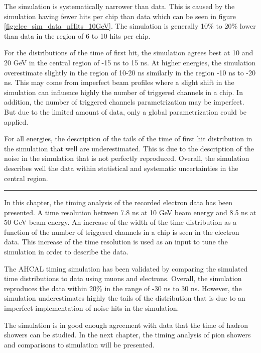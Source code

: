 The simulation is systematically narrower than data. This is caused by the simulation having fewer hits per chip than data which can be seen in figure \ref{fig:elec_sim_data_nHits_10GeV}. The simulation is generally 10\% to 20\% lower than data in the region of 6 to 10 hits per chip.

For the distributions of the time of first hit, the simulation agrees best at 10 and 20 GeV in the central region of -15 ns to 15 ns. At higher energies, the simulation overestimate slightly in the region of 10-20 ns similarly in the region -10 ns to -20 ns. This may come from imperfect beam profiles where a slight shift in the simulation can influence highly the number of triggered channels in a chip. In addition, the number of triggered channels parametrization may be imperfect. But due to the limited amount of data, only a global parametrization could be applied.

For all energies, the description of the tails of the time of first hit distribution in the simulation that well are underestimated. This is due to the description of the noise in the simulation that is not perfectly reproduced. Overall, the simulation describes well the data within statistical and systematic uncertainties in the central region.

\begin{center}
	\rule{0.5\textwidth}{.4pt}
\end{center}

In this chapter, the timing analysis of the recorded electron data has been presented. A time resolution between 7.8 ns at 10 GeV beam energy and 8.5 ns at 50 GeV beam energy. An increase of the width of the time distribution as a function of the number of triggered channels in a chip is seen in the electron data. This increase of the time resolution is used as an input to tune the simulation in order to describe the data.

The AHCAL timing simulation has been validated by comparing the simulated time distributions to data using muons and electrons. Overall, the simulation reproduces the data within 20\% in the range of -30 ns to 30 ns. However, the simulation underestimates highly the tails of the distribution that is due to an imperfect implementation of noise hits in the simulation.

The simulation is in good enough agreement with data that the time of hadron showers can be studied. In the next chapter, the timing analysis of pion showers and comparisons to simulation will be presented.
